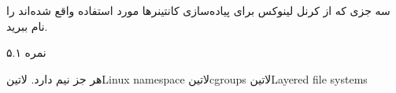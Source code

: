 
سه جزی که از کرنل لینوکس برای پیاده‌سازی کانتینرها مورد استفاده واقع شده‌اند را نام ببرید.

۵.۱ نمره

\begin{پاسخ}

  هر جز نیم دارد.
   ‌لاتین{Linux namespace}
   ‌لاتین{cgroups}
   ‌لاتین{Layered file systems}

\end{پاسخ}
